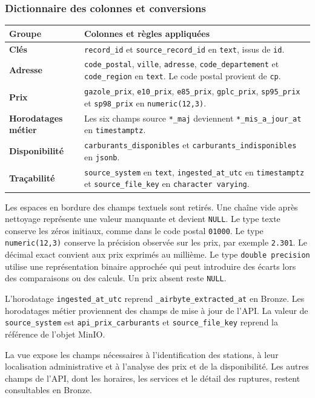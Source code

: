 \documentclass[11pt,a4paper]{article}
\newcommand{\code}[1]{\texttt{#1}}
\begin{document}
\subsubsection{Dictionnaire des colonnes et conversions}

{\small
\begin{tabularx}{\linewidth}{@{}>{\bfseries}p{3cm}X@{}}
\toprule
Groupe & Colonnes et règles appliquées \\
\midrule
Clés &
\code{record\_id} et \code{source\_record\_id} en \code{text},
issus de \code{id}. \\
Adresse &
\code{code\_postal}, \code{ville}, \code{adresse},
\code{code\_departement} et \code{code\_region} en \code{text}.
Le code postal provient de \code{cp}. \\
Prix &
\code{gazole\_prix}, \code{e10\_prix}, \code{e85\_prix},
\code{gplc\_prix}, \code{sp95\_prix} et \code{sp98\_prix}
en \code{numeric(12,3)}. \\
Horodatages métier &
Les six champs source \code{*\_maj} deviennent
\code{*\_mis\_a\_jour\_at} en \code{timestamptz}. \\
Disponibilité &
\code{carburants\_disponibles} et \code{carburants\_indisponibles}
en \code{jsonb}. \\
Traçabilité &
\code{source\_system} en \code{text},
\code{ingested\_at\_utc} en \code{timestamptz}
et \code{source\_file\_key} en \code{character varying}. \\
\bottomrule
\end{tabularx}
}

Les espaces en bordure des champs textuels sont retirés. Une chaîne
vide après nettoyage représente une valeur manquante et devient
\code{NULL}. Le type texte conserve les zéros initiaux, comme dans
le code postal \code{01000}. Le type \code{numeric(12,3)} conserve
la précision observée sur les prix, par exemple \code{2.301}.
Le décimal exact convient aux prix exprimés au millième. Le type
\code{double precision} utilise une représentation binaire approchée
qui peut introduire des écarts lors des comparaisons ou des calculs.
Un prix absent reste \code{NULL}.

L'horodatage \code{ingested\_at\_utc} reprend
\verb|_airbyte_extracted_at| en Bronze. Les horodatages métier
proviennent des champs de mise à jour de l'API. La valeur de
\code{source\_system} est \code{api\_prix\_carburants} et
\code{source\_file\_key} reprend la référence de l'objet MinIO.

La vue expose les champs nécessaires à l'identification des stations,
à leur localisation administrative et à l'analyse des prix et de
la disponibilité. Les autres champs de l'API, dont les horaires,
les services et le détail des ruptures, restent consultables en Bronze.
\end{document}
